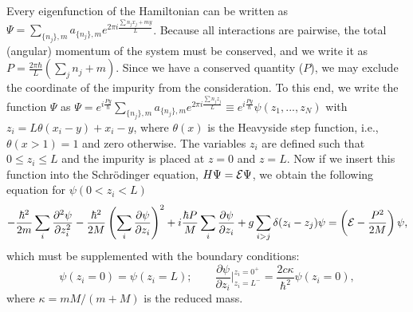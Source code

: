 \documentclass[twocolumn,amsmath,amssymb,showpacs,prl,superscriptaddress,aps]{revtex4-1}
\begin{document}
Every eigenfunction of the Hamiltonian can be written as $\Psi=\sum_{\{n_j\},m} a_{\{n_j\},m}e^{2\pi i \frac{\sum n_jx_j+my}{L}}$. Because all interactions are pairwise, 
the total (angular) momentum of the system must be conserved, and we write it as $P=\frac{2\pi\hbar}{L}\left(\sum_{j} n_j+m\right)$.
Since we have a conserved quantity ($P$), we may exclude the coordinate of the impurity from the consideration. To this end, 
we write the function $\Psi$ as $\Psi=e^{i \frac{P y}{\hbar}}\sum_{\{n_j\},m} a_{\{n_j\},m}e^{2\pi i \frac{\sum n_jz_j}{L}}\equiv e^{i \frac{P y}{\hbar}} \psi(z_1,...,z_N)$ 
with $z_i=L\theta(x_i-y)+x_i-y$, where $\theta(x)$ is the Heavyside step function, i.e., 
$\theta(x>1) = 1$ and zero otherwise. The variables $z_i$ are defined such that $0\leq z_i \leq L$ and the impurity is placed at $z=0$ and $z=L$. Now if we insert this 
function into the Schr{\"o}dinger equation, $H\Psi={\cal E}\Psi$, we obtain the following equation for $\psi(0<z_i<L)$
\begin{equation}
-\frac{\hbar^2}{2m}\sum_i\frac{\partial^2 \psi}{\partial z_i^2}-\frac{\hbar^2}{2M}\left(\sum_{i}\frac{\partial \psi}{\partial z_i}\right)^2
+ i \frac{\hbar P}{M}\sum_{i}\frac{\partial \psi}{\partial z_i}+g\sum_{i>j}\delta(z_i-z_j)\psi=\left({\cal E}-\frac{P^2}{2M}\right)\psi,
\end{equation}
which must be supplemented with the boundary conditions:
\begin{equation}
\psi(z_i=0)=\psi(z_i=L); \qquad \frac{\partial \psi}{\partial z_i}\bigg|^{z_i=0^+}_{z_i=L^-}= \frac{2 c \kappa}{\hbar^2} \psi(z_i=0),
\end{equation}
where $\kappa=mM/(m+M)$ is the reduced mass.
\end{document}
